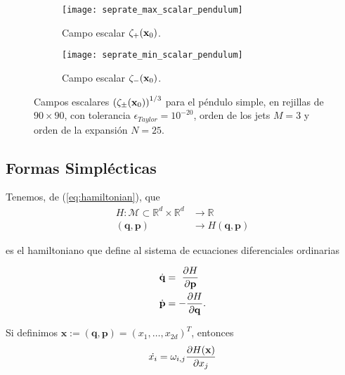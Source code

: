 \begin{figure}[h!]
\centering
\begin{subfigure}{0.49\textwidth}
	\centering
	\texttt{[image: seprate\_max\_scalar\_pendulum]}
	\caption{Campo escalar $\zeta_+(\mathbf{x}_0)$.}
	\label{fig:seprate_max_scalar_pendulum}
\end{subfigure}
%
\begin{subfigure}{0.49\textwidth}
	\centering
	\texttt{[image: seprate\_min\_scalar\_pendulum]}
	\caption{Campo escalar $\zeta_-(\mathbf{x}_0)$.}
	\label{fig:seprate_min_scalar_pendulum}
\end{subfigure}
\caption{ Campos escalares $\left( \zeta_\pm(\mathbf{x}_0) \right)^{1/3}$ para el péndulo simple, en rejillas de $90\times 90$, con tolerancia $\epsilon_{Taylor} = 10^{-20}$, orden de los jets $M=3$ y orden de la expansión $N=25$. }
\label{fig:seprate_scalar_pendulum}
\end{figure}


\subsection{Formas Simplécticas}
\label{sec:formas-simplecticas}

Tenemos, de (\ref{eq:hamiltonian}), que
\begin{align*}
H: \mathcal{M} \subset \mathbb{R}^d\times\mathbb{R}^d &\to \mathbb{R} \\ 
	(\mathbf{q},\mathbf{p}) &\to H(\mathbf{q},\mathbf{p})
\end{align*}

es el hamiltoniano que define al sistema de ecuaciones diferenciales ordinarias

\begin{align*}
 \dot{\mathbf{q}} &= \ \frac{\partial H}{\partial \mathbf{p}} \\
 \dot{\mathbf{p}} &= - \frac{\partial H}{\partial \mathbf{q}}. 
\end{align*}

Si definimos $\mathbf{x} := (\mathbf{q},\mathbf{p}) = (x_1,\ldots,x_{2d})^T$, entonces
\begin{equation}
 \dot{x_i} = \omega_{i,j} \frac{\partial H(\mathbf{x})}{\partial x_j}
 \label{eq:symplectic_ham_ode}
\end{equation}

